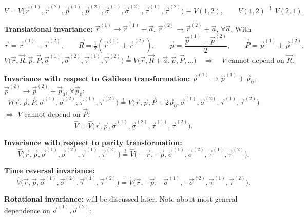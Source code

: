 \documentclass[11pt,a4paper]{article}
\newcommand{\op}[1]{\hat{#1}}
\begin{document}
\[
V=V\big(\vec r^{(1)},\vec r^{(2)},\vec p^{(1)},\vec p^{(2)},\vec\sigma^{(1)},\vec\sigma^{(2)},
\vec\tau^{(1)},\vec\tau^{(2)}\big)\equiv V(1,2),
\qquad
V(1,2)\stackrel{!}{=}V(2,1).
\]

\textbf{Translational invariance:} $\vec r^{(1)}\to\vec r^{(1)}+\vec a$,
$\vec r^{(2)}\to\vec r^{(2)}+\vec a$, $\forall\vec a$. With
\[
\vec r=\vec r^{(1)}-\vec r^{(2)},\qquad \vec R=\tfrac12(\vec r^{(1)}+\vec r^{(2)}),\qquad
\vec p=\frac{\vec p^{(1)}-\vec p^{(2)}}{2},\qquad \vec P=\vec p^{(1)}+\vec p^{(2)},
\]
\[
V\big(\vec r,\vec R,\vec p,\vec P,\vec\sigma^{(1)},\vec\sigma^{(2)},\vec\tau^{(1)},\vec\tau^{(2)}\big)
\stackrel{!}{=}V\big(\vec r,\vec R+\vec a,\vec p,\vec P,\dots\big)
\quad\Rightarrow\quad V \text{ cannot depend on } \vec R .
\]

\textbf{Invariance with respect to Galilean transformation:}
$\vec p^{(1)}\to\vec p^{(1)}+\vec p_0$, $\vec p^{(2)}\to\vec p^{(2)}+\vec p_0$, $\forall\vec p_0$:
\[
V\big(\vec r,\vec p,\vec P,\vec\sigma^{(1)},\vec\sigma^{(2)},\vec\tau^{(1)},\vec\tau^{(2)}\big)
\stackrel{!}{=}V\big(\vec r,\vec p,\vec P+2\vec p_0,\vec\sigma^{(1)},\vec\sigma^{(2)},\vec\tau^{(1)},\vec\tau^{(2)}\big)
\]
$\Rightarrow$ $V$ cannot depend on $\vec P$:
\[
\op V=\op V\big(\vec r,\vec p,\vec\sigma^{(1)},\vec\sigma^{(2)},\vec\tau^{(1)},\vec\tau^{(2)}\big).
\]

\textbf{Invariance with respect to parity transformation:}
\[
\op V\big(\vec r,\vec p,\vec\sigma^{(1)},\vec\sigma^{(2)},\vec\tau^{(1)},\vec\tau^{(2)}\big)
\stackrel{!}{=}\op V\big(-\vec r,-\vec p,\vec\sigma^{(1)},\vec\sigma^{(2)},\vec\tau^{(1)},\vec\tau^{(2)}\big).
\]

\textbf{Time reversal invariance:}
\[
\op V\big(\vec r,\vec p,\vec\sigma^{(1)},\vec\sigma^{(2)},\vec\tau^{(1)},\vec\tau^{(2)}\big)
\stackrel{!}{=}\op V\big(\vec r,-\vec p,-\vec\sigma^{(1)},-\vec\sigma^{(2)},\vec\tau^{(1)},\vec\tau^{(2)}\big).
\]

\textbf{Rotational invariance:}
will be discussed later.
\newline
\newline
Note about most general dependence on \texorpdfstring{$\vec\sigma^{(1)},\vec\sigma^{(2)}$}{sigma1, sigma2}:
\end{document}

